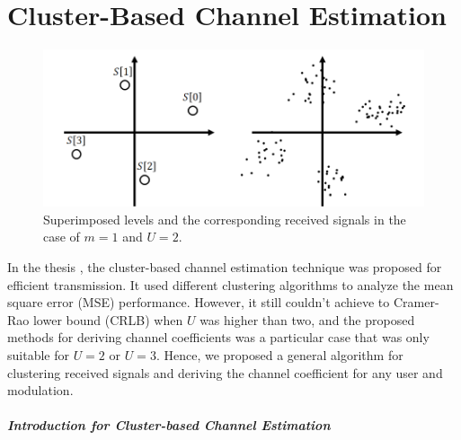 \chapter{Cluster-Based Channel Estimation}
\label{c:cluster_ce}

\begin{figure}[b!]
 \centering
 \includegraphics[width=15cm]{fig/rx_sig_m1_p2.bmp}
 \caption{Superimposed levels and the corresponding received signals in the case of $m=1$ and $U=2$.}
 \label{fig:rx_sig_m1_p2}
\end{figure}

In the thesis \cite{yt19}, the cluster-based channel estimation technique was proposed for efficient transmission. It used different clustering algorithms to analyze the mean square error (MSE) performance. However, it still couldn't achieve to  Cramer-Rao lower bound (CRLB) when $U$ was higher than two, and the proposed methods\cite{yt19} for deriving channel coefficients was a particular case that was only suitable for $U=2$ or $U=3$.  Hence, we proposed a general algorithm for clustering received signals and deriving the channel coefficient for any user and modulation.

\paragraph{Introduction for Cluster-based Channel Estimation}

